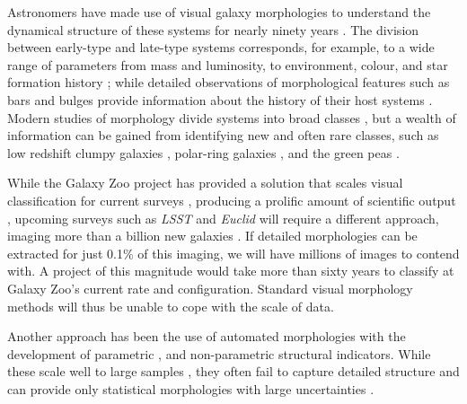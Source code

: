 \documentclass[twocolumn, trackchanges, linenumbers]{aastex6}%
\begin{document}
Astronomers have made use of visual galaxy morphologies to understand the dynamical structure of these systems for nearly ninety years 
\citep[e.g.,][]{Hubble1936, 
			deVauc1959, 
			Sandage1961, 
			vandenBergh1976, 
			NairAbraham2010, 
			Baillard2011}. 
The division between early-type and late-type systems corresponds, for example, to a wide range of parameters from mass and luminosity, to environment, colour, and star formation history 
\citep[e.g.,][]{Kormendy1977,  
			Dressler1980, 
			Strateva2001, 
			Blanton2003, 
			Kauffman2003, 
			Nakamura2003, 
			Shen2003, 
			Peng2010}; 
while detailed observations of morphological features such as bars and bulges 
provide information about the history of their host systems 
\citep[e.g., review by][]{KK04, 
			Elmegreen2008, 
			Sheth2008, 
			Masters2010, 
			Simmons2014}. 
Modern studies of morphology  divide systems into broad classes 
\citep[e.g.,][]{Conselice2006, 
			Lintott2008, 
			Kartaltepe2015, 
			Peth2016}, 
but a wealth of information can be gained from identifying new and often rare classes, 
such as low redshift clumpy galaxies \citep[e.g.,][]{Elmegreen2013}, polar-ring galaxies \citep[e.g.,][]{Whitmore1990}, and the green peas \citep{Cardamone2009}. 


While the Galaxy Zoo project has provided a solution that scales visual classification 
for current surveys \citep{Lintott2008, Lintott2011, Willett2013, Willett2017, Simmons2017},
 producing a prolific amount of scientific output \citep[e.g.,][]{Land2008, Bamford2009,
 Darg2010, Schawinski2014, Galloway2015, Smethurst2016}, upcoming surveys such as
 \textit{LSST} and \textit{Euclid} will require a different approach, imaging more than
 a billion new galaxies  \citep{LSST, Euclid}.  If detailed morphologies can be extracted 
for just  0.1\% of this imaging, we will have millions of images to contend with. 
A project of this magnitude would take more than sixty years to classify at 
Galaxy Zoo's current rate and configuration. Standard visual morphology    
methods will thus be unable to cope with the scale of data. 

Another approach has been the use of automated morphologies with the
 development of parametric \citep{Sersic1968, Odewahn2002, Peng2002}, 
and non-parametric \citep{Abraham1994, Conselice2003, Abraham2003, Lotz2004,
 Freeman2013} structural indicators. While these scale well to large samples 
\citep[e.g.,][]{Simard2011, 
			Griffith2012, 
			Casteels2014, 
			Holwerda2014, 
			Meert2016}, 
they often fail to capture detailed structure and can provide only statistical morphologies with large uncertainties \cite[e.g.,][]{Abraham1996, Bershady2000}. 
\end{document}
